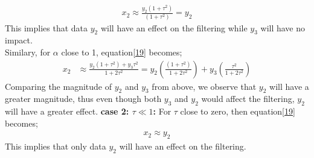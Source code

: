 \documentclass[12pt,a4paper]{article}
\begin{document}
\begin{itemize}
\begin{align*}
	x_{2}\approx\frac{y_{2}(1+\tau^{2})}{(1+\tau^{2})}=y_{2}
	\end{align*}
	This implies that data $y_{2}$ will have an effect on the filtering while $y_{3}$ will have no impact.\\
	Similary, for $\alpha$ close to 1, equation\ref{19} becomes;
	\begin{align*}
	x_{2}&\approx \frac{y_{2}(1+\tau^{2})+y_{3}\tau^{2}}{1+2\tau^{2}}=y_{2}\left(\frac{(1+\tau^{2})}{1+2\tau^{2}}\right)+y_{3}\left(\frac{\tau^{2}}{1+2\tau^{2}}\right)
	\end{align*}
	Comparing the magnitude of $y_{2}$ and $y_{3}$ from above, we observe that $y_{2}$ will have a greater magnitude, thus even though both $y_{3}$ and $y_{2}$ would affect the filtering, $y_{2}$ will have a greater effect.
	\newline
	\textbf{case 2: $\tau \ll 1$:}
	For $\tau$ close to zero, then equation\ref{19} becomes;
	\begin{align*}
	x_{2}\approx y_{2}
	\end{align*}
	This implies that only data $y_{2}$ will have an effect on the filtering.
\end{itemize}
\end{document}
